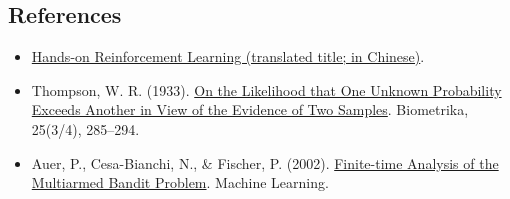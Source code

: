 \FloatBarrier
{}
\hypertarget{references-42}{%
\subsection{References}\label{references-42}}

\vspace{0.25em}
\begin{itemize}
\tightlist
\item
  \href{https://hrl.boyuai.com/}{Hands-on Reinforcement Learning (translated title; in Chinese)}.
\item
  Thompson, W. R. (1933). \href{https://doi.org/10.1093/biomet/25.3-4.285}{On the Likelihood that One Unknown Probability Exceeds Another in View of the Evidence of Two Samples}. Biometrika, 25(3/4), 285--294.
\item
  Auer, P., Cesa-Bianchi, N., \& Fischer, P. (2002). \href{https://link.springer.com/article/10.1023/A:1013689704352}{Finite-time Analysis of the Multiarmed Bandit Problem}. Machine Learning.
\end{itemize}

\clearpage
